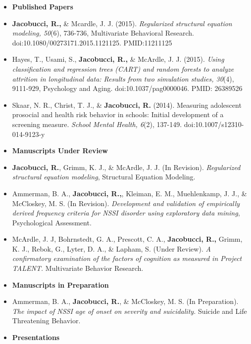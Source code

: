 \documentclass[letterpaper,10pt]{article}
\begin{document}
\begin{itemize}
\item[]{\textbf{\large{Published Papers}}}
%
\item[]\textbf{Jacobucci, R.,} \& Mcardle, J. J. (2015). \emph{Regularized structural equation modeling, 50}(6), 736-736, 
Multivariate Behavioral Research. doi:10.1080/00273171.2015.1121125. PMID:11211125
%
\item[]Hayes, T., Usami, S., \textbf{Jacobucci, R.,} \& McArdle, J. J. (2015). \emph{Using classification and regression trees (CART) and random forests to analyze attrition in longitudinal data: Results from two simulation studies, 30}(4), 9111-929, Psychology and Aging. doi:10.1037/pag0000046. PMID: 26389526
%
\item[]Skaar, N. R., Christ, T. J., \& \textbf{Jacobucci, R.} (2014). Measuring adolescent prosocial and health risk behavior in schools: Initial development of a screening measure. \emph{School Mental Health, 6}(2), 137-149. doi:10.1007/s12310-014-9123-y
%
\item[]{\textbf{\large{Manuscripts Under Review}}}
%
\item[]\textbf{Jacobucci, R.}, Grimm, K. J., \& McArdle, J. J. (In Revision). \emph{Regularized structural equation modeling}, Structural Equation Modeling.
%
\item[]Ammerman, B. A., \textbf{Jacobucci, R.,}, Kleiman, E. M., Muehlenkamp, J. J., \& McCloskey, M. S. (In Revision). \emph{Development and validation of empirically derived frequency criteria for NSSI disorder using exploratory data mining}, Psychological Assessment.
%
\item[]McArdle, J. J, Bohrnstedt, G. A., Prescott, C. A., \textbf{Jacobucci, R.,} Grimm, K. J., Rebok, G., Lyter, D. A., \& Lapham, S. (Under Review). \emph{A confirmatory examination of the factors of cognition as measured in Project TALENT.} Multivariate Behavior Research.
%
\item[]{\textbf{\large{Manuscripts in Preparation}}}
%
\item[]Ammerman, B. A., \textbf{Jacobucci, R.}, \& McCloskey, M. S. (In Preparation). \emph{The impact of NSSI age of onset on severity and suicidality.} Suicide and Life Threatening Behavior.
%
%

%
\item[]{\textbf{\large{Presentations}}}
%


\end{itemize}
\end{document}

